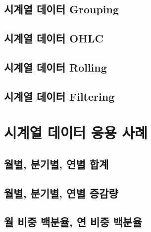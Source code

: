 \documentclass[
]{book}
\begin{document}
\hypertarget{uxc2dcuxacc4uxc5f4-uxb370uxc774uxd130-grouping}{%
\subsection{시계열 데이터 Grouping}\label{uxc2dcuxacc4uxc5f4-uxb370uxc774uxd130-grouping}}

\hypertarget{uxc2dcuxacc4uxc5f4-uxb370uxc774uxd130-ohlc}{%
\subsection{시계열 데이터 OHLC}\label{uxc2dcuxacc4uxc5f4-uxb370uxc774uxd130-ohlc}}

\hypertarget{uxc2dcuxacc4uxc5f4-uxb370uxc774uxd130-rolling}{%
\subsection{시계열 데이터 Rolling}\label{uxc2dcuxacc4uxc5f4-uxb370uxc774uxd130-rolling}}

\hypertarget{uxc2dcuxacc4uxc5f4-uxb370uxc774uxd130-filtering}{%
\subsection{시계열 데이터 Filtering}\label{uxc2dcuxacc4uxc5f4-uxb370uxc774uxd130-filtering}}

\hypertarget{uxc2dcuxacc4uxc5f4-uxb370uxc774uxd130-uxc751uxc6a9-uxc0acuxb840}{%
\section{시계열 데이터 응용 사례}\label{uxc2dcuxacc4uxc5f4-uxb370uxc774uxd130-uxc751uxc6a9-uxc0acuxb840}}

\hypertarget{uxc6d4uxbcc4-uxbd84uxae30uxbcc4-uxc5f0uxbcc4-uxd569uxacc4}{%
\subsection{월별, 분기별, 연별 합계}\label{uxc6d4uxbcc4-uxbd84uxae30uxbcc4-uxc5f0uxbcc4-uxd569uxacc4}}

\hypertarget{uxc6d4uxbcc4-uxbd84uxae30uxbcc4-uxc5f0uxbcc4-uxc99duxac10uxb7c9}{%
\subsection{월별, 분기별, 연별 증감량}\label{uxc6d4uxbcc4-uxbd84uxae30uxbcc4-uxc5f0uxbcc4-uxc99duxac10uxb7c9}}

\hypertarget{uxc6d4-uxbe44uxc911-uxbc31uxbd84uxc728-uxc5f0-uxbe44uxc911-uxbc31uxbd84uxc728}{%
\subsection{월 비중 백분율, 연 비중 백분율}\label{uxc6d4-uxbe44uxc911-uxbc31uxbd84uxc728-uxc5f0-uxbe44uxc911-uxbc31uxbd84uxc728}}
\end{document}
